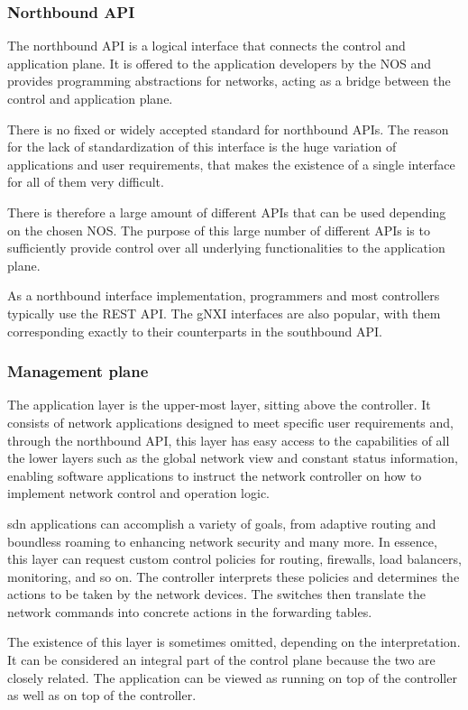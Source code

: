\subsubsection{Northbound API} %
The northbound API is a logical interface that connects the control and application plane. It is offered to the application developers by the NOS\cite{kreutz_software-defined_2015} and provides programming abstractions for networks, acting as a bridge between the control and application plane. \cite{latif_comprehensive_2020}

There is no fixed or widely accepted standard for northbound APIs\cite{kreutz_software-defined_2015}\cite{latif_comprehensive_2020}. The reason for the lack of standardization of this interface is the huge variation of applications and user requirements, that makes the existence of a single interface for all of them very difficult.

There is therefore a large amount of different APIs that can be used depending on the chosen NOS. The purpose of this large number of different APIs is to sufficiently provide control over all underlying functionalities to the application plane\cite{peterson_software-defined_2021}.

As a northbound interface implementation, programmers and most controllers typically use the REST API\cite{latif_comprehensive_2020}. The gNXI interfaces are also popular, with them corresponding exactly to their counterparts in the southbound API. \cite{peterson_software-defined_2021}
        

\subsubsection{Management plane} %
The application layer is the upper-most layer, sitting above the controller. It consists of network applications designed to meet specific user requirements and, through the northbound API, this layer has easy access to the capabilities of all the lower layers such as the global network view and constant status information, enabling software applications to instruct the network controller on how to implement network control and operation logic. \cite{xia_survey_2015} \cite{liatifis_advancing_2023}

\gls{sdn} applications can accomplish a variety of goals, from adaptive routing and boundless roaming to enhancing network security and many more\cite{xia_survey_2015}. In essence, this layer can request custom control policies for routing, firewalls, load balancers, monitoring, and so on. The controller interprets these policies and determines the actions to be taken by the network devices. The switches then translate the network commands into concrete actions in the forwarding tables. \cite{kreutz_software-defined_2015}

The existence of this layer is sometimes omitted, depending on the interpretation. It can be considered an integral part of the control plane because the two are closely related. The application can be viewed as running on top of the controller as well as on top of the controller\cite{peterson_software-defined_2021}.

